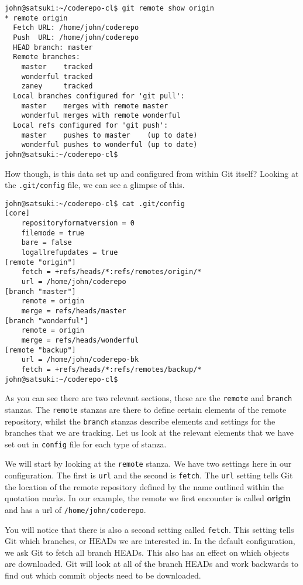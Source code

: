 \begin{Verbatim}
john@satsuki:~/coderepo-cl$ git remote show origin
* remote origin
  Fetch URL: /home/john/coderepo
  Push  URL: /home/john/coderepo
  HEAD branch: master
  Remote branches:
    master    tracked
    wonderful tracked
    zaney     tracked
  Local branches configured for 'git pull':
    master    merges with remote master
    wonderful merges with remote wonderful
  Local refs configured for 'git push':
    master    pushes to master    (up to date)
    wonderful pushes to wonderful (up to date)
john@satsuki:~/coderepo-cl$
\end{Verbatim}

How though, is this data set up and configured from within Git itself?
Looking at the \texttt{.git/config} file, we can see a glimpse of this.

\begin{Verbatim}
john@satsuki:~/coderepo-cl$ cat .git/config
[core]
	repositoryformatversion = 0
	filemode = true
	bare = false
	logallrefupdates = true
[remote "origin"]
	fetch = +refs/heads/*:refs/remotes/origin/*
	url = /home/john/coderepo
[branch "master"]
	remote = origin
	merge = refs/heads/master
[branch "wonderful"]
	remote = origin
	merge = refs/heads/wonderful
[remote "backup"]
	url = /home/john/coderepo-bk
	fetch = +refs/heads/*:refs/remotes/backup/*
john@satsuki:~/coderepo-cl$
\end{Verbatim}

As you can see there are two relevant sections, these are the \texttt{remote} and \texttt{branch} stanzas.
The \texttt{remote} stanzas are there to define certain elements of the remote repository, 
whilst the \texttt{branch} stanzas describe elements and settings for the branches that we are tracking.
Let us look at the relevant elements that we have set out in \texttt{config} file for each type of stanza.

We will start by looking at the \texttt{remote} stanza. We have two settings here in our configuration.
The first is \texttt{url} and the second is \texttt{fetch}.
The \texttt{url} setting tells Git the location of the remote repository defined by the name outlined within the quotation marks.
In our example, the remote we first encounter is called \textbf{origin} and has a url of \texttt{/home/john/coderepo}.

You will notice that there is also a second setting called \texttt{fetch}.
This setting tells Git which branches, or HEADs we are interested in. In the default configuration, we ask Git to fetch all branch HEADs.
This also has an effect on which objects are downloaded.
Git will look at all of the branch HEADs and work backwards to find out which commit objects need to be downloaded.

